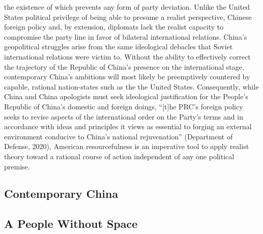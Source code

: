 \documentclass[12pt]{article}
\begin{document}
the existence of which prevents any form of party deviation. Unlike the United States political privilege of being able to presume a realist perspective, Chinese foreign policy and, by extension, diplomats lack the realist capacity to compromise the party line in favor of bilateral international relations. China's geopolitical struggles arise from the same ideological debacles that Soviet international relations were victim to. Without the ability to effectively correct the trajectory of the Republic of China's presence on the international stage, contemporary China's ambitions will most likely be preemptively countered by capable, rational nation-states such as the the United States. Consequently, while China and China apologists must seek ideological justification for the People's Republic of China's domestic and foreign doings, “[t]he PRC's foreign policy seeks to revise aspects of the international order on the Party's terms and in accordance with ideas and principles it views as essential to forging an external environment conducive to China's national rejuvenation” (Department of Defense, 2020), American resourcefulness is an imperative tool to apply realist theory toward a rational course of action independent of any one political premise.
\begin{center}
  \section{Contemporary China}
\end{center}
\begin{center}
  \subsection{A People Without Space}
\end{center}
\end{document}
